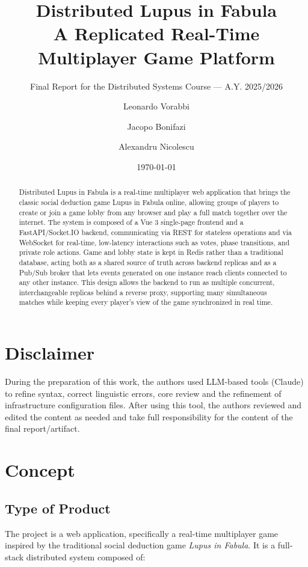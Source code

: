 \documentclass{scrartcl}
\title{\LARGE
    Distributed Lupus in Fabula\\
    A Replicated Real-Time Multiplayer Game Platform
}
\subtitle{Final Report for the Distributed Systems Course --- A.Y. 2025/2026}
\author{
    Leonardo Vorabbi \\ \emailaddr{leonardo.vorabbi@studio.unibo.it}
    \and
    Jacopo Bonifazi \\ \emailaddr{jacopo.bonifazi@studio.unibo.it}
    \and
    Alexandru Nicolescu \\ \emailaddr{alexandru.nicolescu@studio.unibo.it}
}
\date{\today}
\begin{document}
\maketitle

\begin{abstract}
      Distributed Lupus in Fabula is a real-time multiplayer web application that brings the classic social deduction game Lupus in Fabula online, allowing groups of players to create or join a game lobby from any browser and play a full match together over the internet.
      The system is composed of a Vue 3 single-page frontend and a FastAPI/Socket.IO backend, communicating via REST for stateless operations and via WebSocket for real-time, low-latency interactions such as votes, phase transitions, and private role actions. Game and lobby state is kept in Redis rather than a traditional database, acting both as a shared source of truth across backend replicas and as a Pub/Sub broker that lets events generated on one instance reach clients connected to any other instance.
      This design allows the backend to run as multiple concurrent, interchangeable replicas behind a reverse proxy, supporting many simultaneous matches while keeping every player's view of the game synchronized in real time.
\end{abstract}

\section*{Disclaimer}

During the preparation of this work, the authors used LLM-based tools (Claude) to refine syntax, correct linguistic errors, core review and the refinement of infrastructure configuration files.
After using this tool, the authors reviewed and edited the content as needed and take full responsibility for the content of the final report/artifact.

\section{Concept}\label{Concept}

\subsection{Type of Product}\label{type-of-product}

The project is a web application, specifically a real-time multiplayer game
inspired by the traditional social deduction game \emph{Lupus in Fabula}. It
is a full-stack distributed system composed of:
\end{document}
